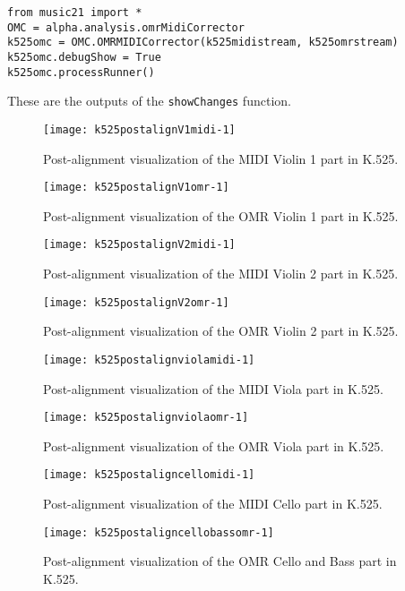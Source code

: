 \begin{verbatim}
from music21 import *
OMC = alpha.analysis.omrMidiCorrector
k525omc = OMC.OMRMIDICorrector(k525midistream, k525omrstream)
k525omc.debugShow = True
k525omc.processRunner()
\end{verbatim}

These are the outputs of the \texttt{showChanges} function.

\begin{figure}[H]
\centering
\texttt{[image: k525postalignV1midi-1]}
\caption{Post-alignment visualization of the MIDI Violin 1 part in K.525.}
\end{figure}

\begin{figure}[H]
\centering
\texttt{[image: k525postalignV1omr-1]}
\caption{Post-alignment visualization of the OMR Violin 1 part in K.525.}
\end{figure}

\begin{figure}[H]
\centering
\texttt{[image: k525postalignV2midi-1]}
\caption{Post-alignment visualization of the MIDI Violin 2 part in K.525.}
\end{figure}

\begin{figure}[H]
\centering
\texttt{[image: k525postalignV2omr-1]}
\caption{Post-alignment visualization of the OMR Violin 2 part in K.525.}
\end{figure}

\begin{figure}[H]
\centering
\texttt{[image: k525postalignviolamidi-1]}
\caption{Post-alignment visualization of the MIDI Viola part in K.525.}
\end{figure}

\begin{figure}[H]
\centering
\texttt{[image: k525postalignviolaomr-1]}
\caption{Post-alignment visualization of the OMR Viola part in K.525.}
\end{figure}

\begin{figure}[H]
\centering
\texttt{[image: k525postaligncellomidi-1]}
\caption{Post-alignment visualization of the MIDI Cello part in K.525.}
\end{figure}

\begin{figure}[H]
\centering
\texttt{[image: k525postaligncellobassomr-1]}
\caption{Post-alignment visualization of the OMR Cello and Bass part in K.525.}
\end{figure}


